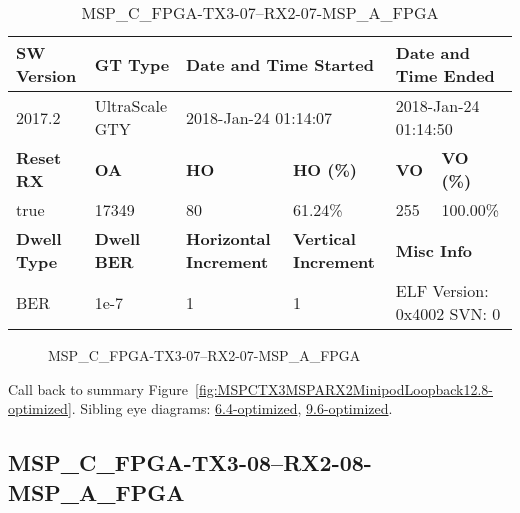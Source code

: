 \begin{table}[h]
\centering
\caption{MSP\_C\_FPGA-TX3-07--RX2-07-MSP\_A\_FPGA}
\label{tab:MSPCFPGATX307RX207MSPAFPGA12.8-optimized}
\begin{tabular}{@{}|l|l|l|l|l|l|@{}}
\toprule
\textbf{SW Version}                & \textbf{GT Type}   & \multicolumn{2}{l|}{\textbf{Date and Time Started}}            & \multicolumn{2}{l|}{\textbf{Date and Time Ended}}        \\ \midrule
2017.2                       & UltraScale GTY          & \multicolumn{2}{l|}{2018-Jan-24 01:14:07}                   & \multicolumn{2}{l|}{2018-Jan-24 01:14:50}               \\ \midrule
\textbf{Reset RX}                  & \textbf{OA} & \textbf{HO}   & \textbf{HO (\%)} & \textbf{VO} & \textbf{VO (\%)} \\ \midrule
true & 17349        & 80          & 61.24\%        & 255        & 100.00\%       \\ \midrule
\textbf{Dwell Type}                & \textbf{Dwell BER} & \textbf{Horizontal Increment} & \textbf{Vertical Increment}    & \multicolumn{2}{l|}{\textbf{Misc Info}}                  \\ \midrule
BER                            & 1e-7        & 1        & 1           & \multicolumn{2}{l|}{ELF Version: 0x4002 SVN: 0}                         \\ \bottomrule
\end{tabular}
\end{table}

\begin{figure}[h]
\caption{MSP\_C\_FPGA-TX3-07--RX2-07-MSP\_A\_FPGA} \label{fig:MSPCFPGATX307RX207MSPAFPGA12.8-optimized}
\end{figure}

Call back to summary Figure~\ref{fig:MSPCTX3MSPARX2MinipodLoopback12.8-optimized}.
Sibling eye diagrams: \hyperref[sec:MSPCFPGATX307RX207MSPAFPGA6.4-optimized]{6.4-optimized}, \hyperref[sec:MSPCFPGATX307RX207MSPAFPGA9.6-optimized]{9.6-optimized}.

\clearpage
\newpage


\subsection{MSP\_C\_FPGA-TX3-08--RX2-08-MSP\_A\_FPGA}\label{sec:MSPCFPGATX308RX208MSPAFPGA12.8-optimized}

